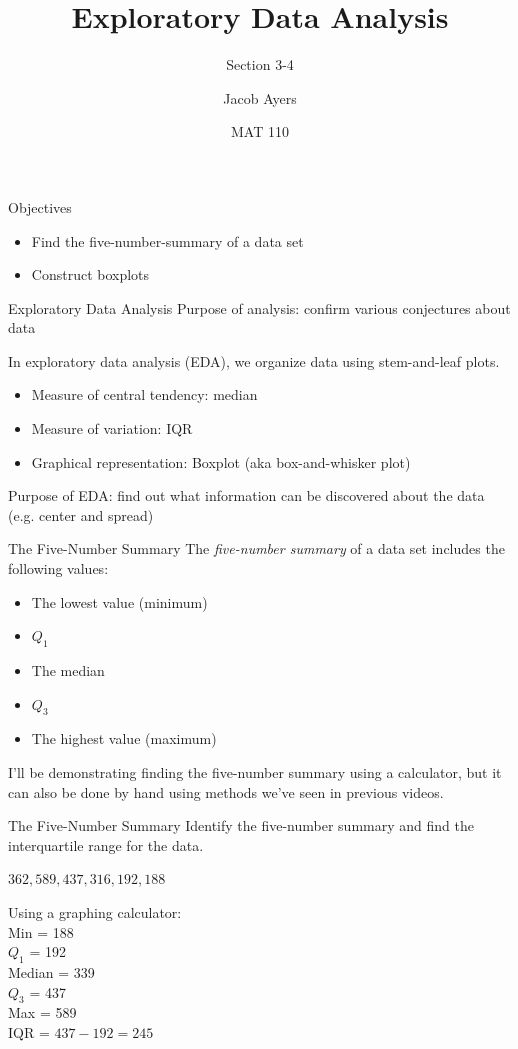 \documentclass[t, aspectratio=169]{beamer}
\title[3-4]{Exploratory Data Analysis}
\subtitle{Section 3-4}
\author{Jacob Ayers}
\institute{Lesson \#8}
\date{MAT 110}
\newcommand{\?}{\stackrel{?}{=}}
\begin{document}
	
	\begin{frame}
		\titlepage
	\end{frame}
	
	\begin{frame}{Objectives}
		\begin{itemize}
			\item Find the five-number-summary of a data set
			\item Construct boxplots
		\end{itemize}
	\end{frame}

	\begin{frame}{Exploratory Data Analysis}
		Purpose of analysis: confirm various conjectures about data \pause
		
		In exploratory data analysis (EDA), we organize data using stem-and-leaf plots. \begin{itemize}
			\item Measure of central tendency: median
			\item Measure of variation: IQR
			\item Graphical representation: Boxplot (aka box-and-whisker plot)
		\end{itemize} \pause
	
		Purpose of EDA: find out what information can be discovered about the data (e.g. center and spread)
	\end{frame}

	\begin{frame}{The Five-Number Summary}
		The \textit{five-number summary} of a data set includes the following values: \begin{itemize}
			\item The lowest value (minimum) \pause
			\item $Q_1$ \pause
			\item The median \pause
			\item $Q_3$ \pause
			\item The highest value (maximum)
		\end{itemize} \pause
	
		I'll be demonstrating finding the five-number summary using a calculator, but it can also be done by hand using methods we've seen in previous videos.
	\end{frame}

	\begin{frame}{The Five-Number Summary}
		Identify the five-number summary and find the interquartile range for the data.
		
		$362, 589, 437, 316, 192, 188$ \pause
		
		Using a graphing calculator: \\
		Min = 188 \\
		$Q_1$ = 192 \\
		Median = 339 \\
		$Q_3$ = 437 \\
		Max = 589 \\
		IQR = $437 - 192 = 245$
	\end{frame}
\end{document}
